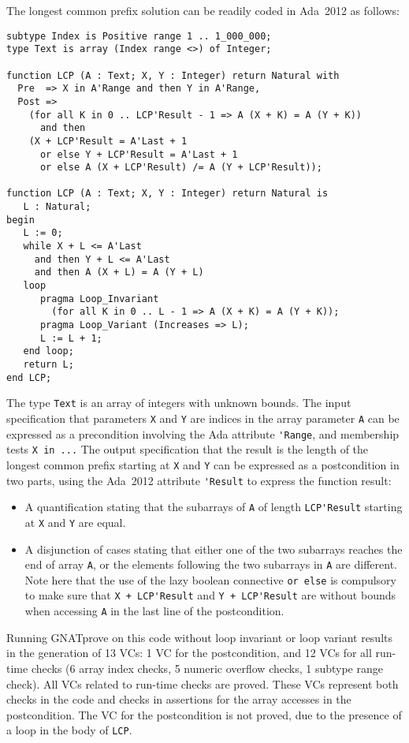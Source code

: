 \documentclass[sttt,draft]{svjour}
\newcommand{\gnatprove}{GNATprove\xspace}
\newcommand{\adatwtw}{Ada~2012\xspace}
\begin{document}
The longest common prefix solution can be readily coded in \adatwtw as follows:

\begin{footnotesize}
\begin{verbatim}
subtype Index is Positive range 1 .. 1_000_000;
type Text is array (Index range <>) of Integer;

function LCP (A : Text; X, Y : Integer) return Natural with
  Pre  => X in A'Range and then Y in A'Range,
  Post =>
    (for all K in 0 .. LCP'Result - 1 => A (X + K) = A (Y + K))
      and then
    (X + LCP'Result = A'Last + 1
      or else Y + LCP'Result = A'Last + 1
      or else A (X + LCP'Result) /= A (Y + LCP'Result));

function LCP (A : Text; X, Y : Integer) return Natural is
   L : Natural;
begin
   L := 0;
   while X + L <= A'Last
     and then Y + L <= A'Last
     and then A (X + L) = A (Y + L)
   loop
      pragma Loop_Invariant
        (for all K in 0 .. L - 1 => A (X + K) = A (Y + K));
      pragma Loop_Variant (Increases => L);
      L := L + 1;
   end loop;
   return L;
end LCP;
\end{verbatim}
\end{footnotesize}

The type \verb|Text| is an array of integers with unknown bounds. The input
specification that parameters \verb|X| and \verb|Y| are indices in the array
parameter \verb|A| can be expressed as a precondition involving the Ada
attribute \verb|'Range|, and membership tests \verb|X in ...| The output
specification that the result is the length of the longest common prefix
starting at \verb|X| and \verb|Y| can be expressed as a postcondition in two
parts, using the \adatwtw attribute \verb|'Result| to express the function
result:
\begin{itemize}
\item A quantification stating that the subarrays of \verb|A| of length
  \verb|LCP'Result| starting at \verb|X| and \verb|Y| are equal.
\item A disjunction of cases stating that either one of the two subarrays
  reaches the end of array \verb|A|, or the elements following the two
  subarrays in \verb|A| are different. Note here that the use of the lazy
  boolean connective \verb|or else| is compulsory to make sure that
  \verb|X + LCP'Result| and \verb|Y + LCP'Result| are without bounds when
  accessing \verb|A| in the last line of the postcondition.
\end{itemize}

Running \gnatprove on this code without loop invariant or loop variant results
in the generation of 13 VCs: 1 VC for the postcondition, and 12 VCs for all
run-time checks (6 array index checks, 5 numeric overflow checks, 1 subtype
range check). All VCs related to run-time checks are proved. These VCs
represent both checks in the code and checks in assertions for the array
accesses in the postcondition. The VC for the postcondition is not proved, due
to the presence of a loop in the body of \verb|LCP|.
\end{document}
